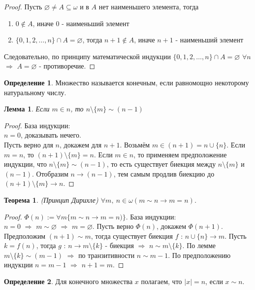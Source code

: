 \documentclass[a4paper, 12pt]{article}
\theoremstyle{definition}
\newtheorem*{definition}{Определение}
\theoremstyle{plain}
\newtheorem*{theorem}{Теорема}
\newtheorem*{lemma}{Лемма}
\theoremstyle{remark}
\begin{document}
  \begin{proof}
    Пусть $\varnothing\not= A\subseteq\omega$ и в $A$ нет наименьшего элемента, тогда
    \begin{enumerate}
      \item $0\notin A$, иначе $0$ - наименьший элемент
      \item $\{0,1,2,\ldots,n\}\cap A=\varnothing$, тогда $n+1\notin A$, иначе $n+1$ - наименьший элемент
    \end{enumerate}
    Следовательно, по принципу математической индукции $\{0,1,2,\ldots,n\}\cap A=\varnothing$ $\forall n$ $\Longrightarrow$ $A=\varnothing$ - противоречие.
  \end{proof}
  \begin{definition}
    Множество называется конечным, если равномощно некоторому натуральному числу.
  \end{definition}
  \begin{lemma}
    Если $m\in n$, то $n\setminus\{m\}\sim(n-1)$
  \end{lemma}
  \begin{proof}
    База индукции:\\
    $n=0$, доказывать нечего.\\
    Пусть верно для $n$, докажем для $n+1$. Возьмём $m\in (n+1)=n\cup\{n\}$. Если $m=n$, то $(n+1)\setminus \{m\}=n$. Если $m\in n$, то применяем предположение индукции, что $n\setminus\{m\}\sim (n-1)$, то есть существует биекция между $n\setminus\{m\}$ и $(n-1)$. Отобразим $n\to (n-1)$, тем самым продлив биекцию до $(n+1)\setminus\{m\}\to n$.
  \end{proof}
  \begin{theorem}(Принцип Дирихле)
    $\forall m, \ n\in\omega(m\sim n\to m=n)$.
  \end{theorem}
  \begin{proof}
    $\Phi(n):=\forall m\{m\sim n\to m=n)\}$.
    База индукции:\\
    $n=0$ $\Longrightarrow$ $m\sim\varnothing$ $\Longrightarrow$ $m=\varnothing$.
    Пусть верно $\Phi(n)$, докажем $\Phi(n+1)$. Предположим $(n+1)\sim m$, тогда существует биекция $f$ : $n\cup\{n\}\to m$. Пусть $k=f(n)$, тогда $g$ : $n\to m\setminus\{k\}$ - биекция $\Longrightarrow$ $n\sim m\setminus\{k\}$. По лемме $m\setminus\{k\}\sim(m-1)$ $\Longrightarrow$ по транзитивности $n\sim m-1$. По предположению индукции $n=m-1$ $\Longrightarrow$ $n+1=m$.
  \end{proof}
  \begin{definition}
    Для конечного множества $x$ полагаем, что $|x|=n$, если $x\sim n$. 
  \end{definition}
\end{document}
